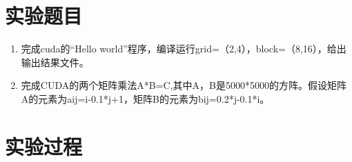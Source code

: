 \documentclass[10pt,letterpaper]{ctexart}
\begin{document}
\pagestyle{plain}
\title{
    \begin{center}
        \phantom{Start!}
        \vspace{2cm}
    \end{center}
}
\maketitle

\begin{center}
    \setlength{\baselineskip}{40pt}
    \vspace{1cm}
\end{center}
\pagebreak






\section{实验题目}
\begin{enumerate}[itemindent=2em,label=\arabic*、]
\item 完成cuda的“Hello world”程序，编译运行grid=（2,4），block=（8,16），给出输出结果文件。

\item 完成CUDA的两个矩阵乘法A*B=C,其中A，B是5000*5000的方阵。假设矩阵A的元素为aij=i-0.1*j+1，矩阵B的元素为bij=0.2*j-0.1*i。
\end{enumerate}

\section{实验过程}
\end{document}
